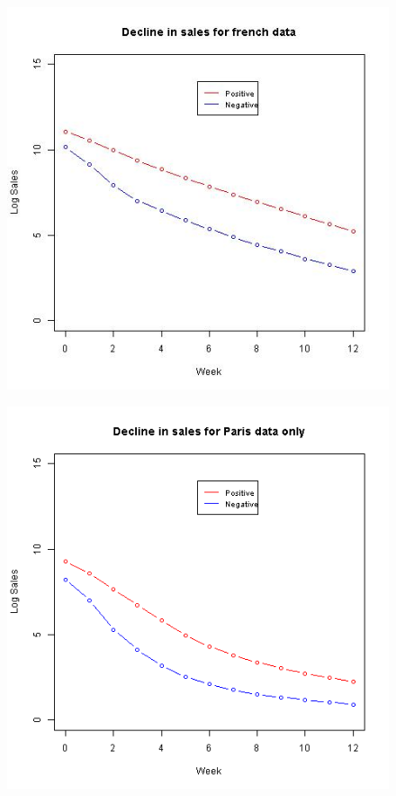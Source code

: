 \begin{figure}\centering
	\label{part2.1_plot_fr}
	\includegraphics[scale=0.5]{plot_fr.png}
\end{figure}
\begin{figure}\centering
	\label{part2.1_plot_paris}
	\includegraphics[scale=0.5]{plot_paris_only.png}
\end{figure}

